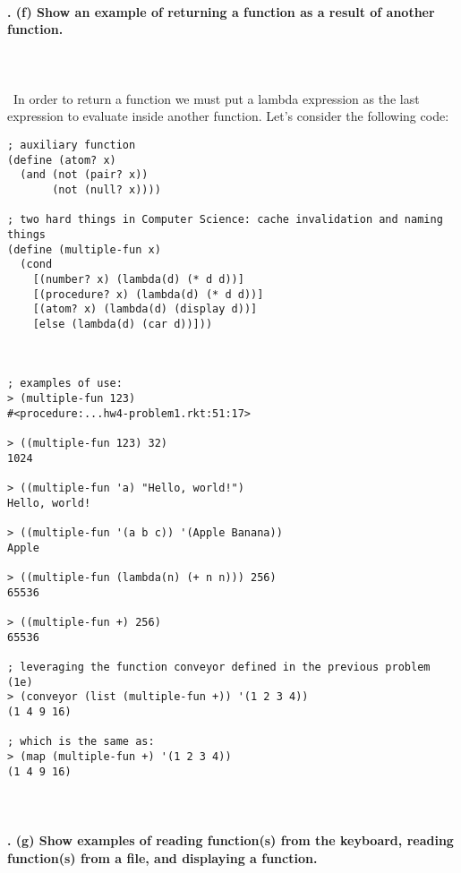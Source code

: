 \documentclass{article}
\begin{document}
\paragraph{}\
\paragraph{. (f) Show an example of returning a function as a result of another function.}\
\paragraph{}\
In order to return a function we must put a lambda expression as the last expression to evaluate inside another function. Let's consider the following code:
\begin{verbatim}
; auxiliary function
(define (atom? x)
  (and (not (pair? x))
       (not (null? x))))   
 
; two hard things in Computer Science: cache invalidation and naming things
(define (multiple-fun x)
  (cond
    [(number? x) (lambda(d) (* d d))]
    [(procedure? x) (lambda(d) (* d d))]
    [(atom? x) (lambda(d) (display d))]
    [else (lambda(d) (car d))]))
    
    
    
; examples of use:
> (multiple-fun 123)
#<procedure:...hw4-problem1.rkt:51:17>

> ((multiple-fun 123) 32)
1024

> ((multiple-fun 'a) "Hello, world!")
Hello, world!

> ((multiple-fun '(a b c)) '(Apple Banana))
Apple

> ((multiple-fun (lambda(n) (+ n n))) 256)
65536

> ((multiple-fun +) 256)
65536

; leveraging the function conveyor defined in the previous problem (1e)
> (conveyor (list (multiple-fun +)) '(1 2 3 4))
(1 4 9 16) 

; which is the same as:
> (map (multiple-fun +) '(1 2 3 4))
(1 4 9 16)
\end{verbatim}

\paragraph{}\
\paragraph{. (g) Show examples of reading function(s) from the keyboard, reading function(s) from a file, and displaying a function.}\
\end{document}

